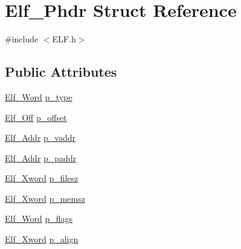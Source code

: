 \hypertarget{struct_elf___phdr}{\section{Elf\+\_\+\+Phdr Struct Reference}
\label{struct_elf___phdr}
}


{\ttfamily \#include $<$E\+L\+F.\+h$>$}

\subsection*{Public Attributes}
\begin{DoxyCompactItemize}
\item 
\hyperlink{_e_l_f_8h_a497c5f6b52d8b0a104779c9e0c2da019}{Elf\+\_\+\+Word} \hyperlink{struct_elf___phdr_af3c63d32247aa09a84c497809dc27d8b}{p\+\_\+type}
\item 
\hyperlink{_e_l_f_8h_a09549f5ac4e10f52b46f6dba8d8623bd}{Elf\+\_\+\+Off} \hyperlink{struct_elf___phdr_a2b1e0d55f2c1d55fd12588a0be1e2897}{p\+\_\+offset}
\item 
\hyperlink{_e_l_f_8h_a83694be97fb890d1883ac3c680ca523d}{Elf\+\_\+\+Addr} \hyperlink{struct_elf___phdr_a3c26aa6089ef8332572f6567f368bea6}{p\+\_\+vaddr}
\item 
\hyperlink{_e_l_f_8h_a83694be97fb890d1883ac3c680ca523d}{Elf\+\_\+\+Addr} \hyperlink{struct_elf___phdr_addf69d829ef4841558be02cd37f2d0c9}{p\+\_\+paddr}
\item 
\hyperlink{_e_l_f_8h_a263b2f2f4e5a063471c762c3c6819409}{Elf\+\_\+\+Xword} \hyperlink{struct_elf___phdr_a5dc93e17daa09e66ccd21dcaaf51c507}{p\+\_\+filesz}
\item 
\hyperlink{_e_l_f_8h_a263b2f2f4e5a063471c762c3c6819409}{Elf\+\_\+\+Xword} \hyperlink{struct_elf___phdr_aef06a5f4e9ed8d8f509d8542a12efd79}{p\+\_\+memsz}
\item 
\hyperlink{_e_l_f_8h_a497c5f6b52d8b0a104779c9e0c2da019}{Elf\+\_\+\+Word} \hyperlink{struct_elf___phdr_a753c26d1604405674dc8a813f1d1dcd1}{p\+\_\+flags}
\item 
\hyperlink{_e_l_f_8h_a263b2f2f4e5a063471c762c3c6819409}{Elf\+\_\+\+Xword} \hyperlink{struct_elf___phdr_a62df4dfc2433886f85e6b443f1e1a9f4}{p\+\_\+align}
\end{DoxyCompactItemize}


